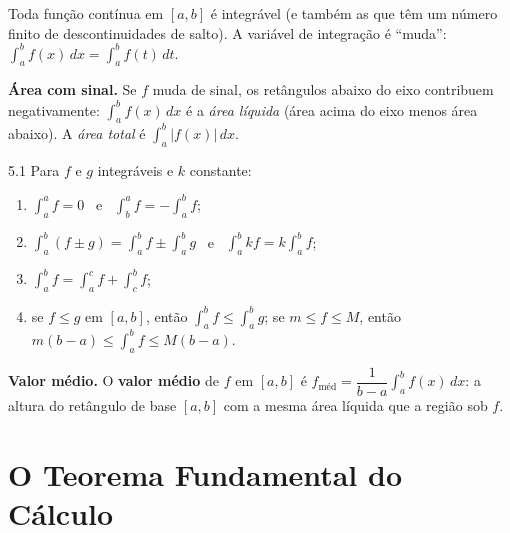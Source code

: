 Toda função contínua em $[a,b]$ é integrável (e também as que têm um número finito de
descontinuidades de salto). A variável de integração é ``muda'':
$\int_a^bf(x)\,dx=\int_a^bf(t)\,dt$.

\textbf{Área com sinal.} Se $f$ muda de sinal, os retângulos abaixo do eixo contribuem
negativamente: $\int_a^bf(x)\,dx$ é a \emph{área líquida} (área acima do eixo menos área
abaixo). A \emph{área total} é $\int_a^b|f(x)|\,dx$.


\begin{teorema}{5.1}
Para $f$ e $g$ integráveis e $k$ constante:
\begin{enumerate}[label=(\roman*)]
\item $\int_a^a f=0$ \ e \ $\int_b^a f=-\int_a^b f$;
\item $\int_a^b(f\pm g)=\int_a^bf\pm\int_a^bg$ \ e \ $\int_a^bkf=k\int_a^bf$;
\item $\int_a^bf=\int_a^cf+\int_c^bf$;
\item se $f\le g$ em $[a,b]$, então $\int_a^bf\le\int_a^bg$; se $m\le f\le M$, então
  $m(b-a)\le\int_a^bf\le M(b-a)$.
\end{enumerate}
\end{teorema}

\textbf{Valor médio.} O \textbf{valor médio} de $f$ em $[a,b]$ é
$f_{\text{méd}}=\dfrac1{b-a}\displaystyle\int_a^bf(x)\,dx$: a altura do retângulo de base
$[a,b]$ com a mesma área líquida que a região sob $f$.

\section{O Teorema Fundamental do Cálculo}

